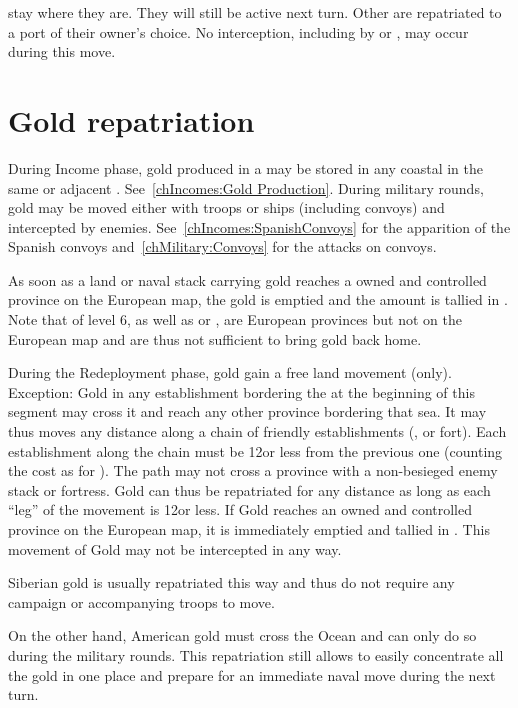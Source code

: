 \bparag {} \corsaire stay where they are. They will still be
active next turn.
\bparag Other \corsaire are repatriated to a port of their owner's choice.
\bparag No interception, including by \Presidios or \StraitFort, may occur
during this move.

\section{Gold repatriation}\label{chRedep:Gold Repatriation}

\bparag[Income.] During Income phase, gold produced in a \COL may be stored in
any coastal \COL in the same or adjacent \Area. See~\ref{chIncomes:Gold
  Production}.
\bparag[Military.] During military rounds, gold may be moved either with
troops or ships (including convoys) and intercepted by
enemies. See~\ref{chIncomes:SpanishConvoys} for the apparition of the Spanish
convoys and~\ref{chMilitary:Convoys} for the attacks on convoys.

\bparag As soon as a land or naval stack carrying gold reaches a owned and
controlled province on the European map, the gold is emptied and the amount is
tallied in .
\bparag Note that \COL of level 6, as well as \provinceAcores or
, are European provinces but not on the European map
and are thus not sufficient to bring gold back home.

\label{chBudget:Gold Transportation}
\bparag During the Redeployment phase, gold gain a free land movement (only).
\bparag Exception: Gold in any establishment bordering the \seazoneCaspienne
at the beginning of this segment may cross it and reach any other province
bordering that sea.
\bparag It may thus moves any distance along a chain of friendly
establishments (\COL, \TP or fort).
\bparag Each establishment along the chain must be 12\MP or less from the
previous one (counting the cost as for \LD).
\bparag The path may not cross a province with a non-besieged enemy stack or
fortress.
\bparag Gold can thus be repatriated for any distance as long as each ``leg''
of the movement is 12\MP or less.
\bparag If Gold reaches an owned and controlled province on the European map,
it is immediately emptied and tallied in .
\bparag This movement of Gold may not be intercepted in any way.

\begin{designnote}
  Siberian gold is usually repatriated this way and thus do not require
  any campaign or accompanying troops to move.

  On the other hand, American gold must cross the Ocean and can only do
  so during the military rounds. This repatriation still allows to
  easily concentrate all the gold in one place and prepare for an
  immediate naval move during the next turn.
\end{designnote}

